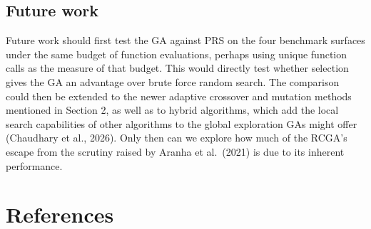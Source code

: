 \documentclass[
  a4paper,
]{article}
\newcommand{\+}{\phantom{-}}
\begin{document}
\subsection{Future work}\label{future-work}

Future work should first test the GA against PRS on the four benchmark
surfaces under the same budget of function evaluations, perhaps using
unique function calls as the measure of that budget. This would directly
test whether selection gives the GA an advantage over brute force random
search. The comparison could then be extended to the newer adaptive
crossover and mutation methods mentioned in Section 2, as well as to
hybrid algorithms, which add the local search capabilities of other
algorithms to the global exploration GAs might offer (Chaudhary et al.,
2026). Only then can we explore how much of the RCGA's escape from the
scrutiny raised by Aranha et al.~(2021) is due to its inherent
performance.

\newpage

\section{References}\label{references}
\end{document}
